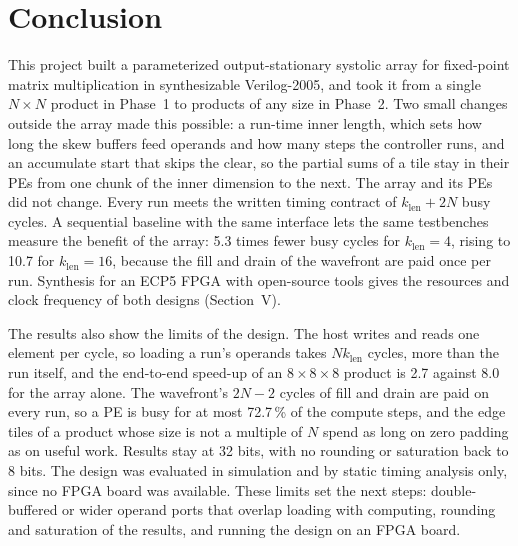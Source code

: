 
\section{Conclusion}
This project built a parameterized output-stationary systolic array for fixed-point matrix multiplication in synthesizable Verilog-2005, and took it from a single $N \times N$ product in Phase~1 to products of any size in Phase~2. Two small changes outside the array made this possible: a run-time inner length, which sets how long the skew buffers feed operands and how many steps the controller runs, and an accumulate start that skips the clear, so the partial sums of a tile stay in their PEs from one chunk of the inner dimension to the next. The array and its PEs did not change. Every run meets the written timing contract of $k_{\mathrm{len}} + 2N$ busy cycles. A sequential baseline with the same interface lets the same testbenches measure the benefit of the array: 5.3 times fewer busy cycles for $k_{\mathrm{len}} = 4$, rising to 10.7 for $k_{\mathrm{len}} = 16$, because the fill and drain of the wavefront are paid once per run. Synthesis for an ECP5 FPGA with open-source tools gives the resources and clock frequency of both designs (Section~V).

The results also show the limits of the design. The host writes and reads one element per cycle, so loading a run's operands takes $N k_{\mathrm{len}}$ cycles, more than the run itself, and the end-to-end speed-up of an $8 \times 8 \times 8$ product is 2.7 against 8.0 for the array alone. The wavefront's $2N - 2$ cycles of fill and drain are paid on every run, so a PE is busy for at most 72.7\,\% of the compute steps, and the edge tiles of a product whose size is not a multiple of $N$ spend as long on zero padding as on useful work. Results stay at 32 bits, with no rounding or saturation back to 8 bits. The design was evaluated in simulation and by static timing analysis only, since no FPGA board was available. These limits set the next steps: double-buffered or wider operand ports that overlap loading with computing, rounding and saturation of the results, and running the design on an FPGA board.
